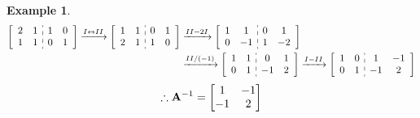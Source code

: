 \documentclass[12pt, a4paper]{article}
\newtheorem{eg}{Example}[subsection]
\def\matrixA{\vb{A}}
\begin{document}
\begin{eg}
\[\begin{aligned}\left[\begin{array}{c:c}\begin{matrix}2&1\\1&1\end{matrix}&\begin{matrix}1&0\\0&1\end{matrix}\end{array}\right]\xrightarrow[]{I\leftrightarrow II}\left[\begin{array}{c:c}\begin{matrix}1&1\\2&1\end{matrix}&\begin{matrix}0&1\\1&0\end{matrix}\end{array}\right]&\xrightarrow[]{II-2I}\left[\begin{array}{c:c}\begin{matrix}1&1\\0&-1\end{matrix}&\begin{matrix}0&1\\1&-2\end{matrix}\end{array}\right]\\&\xrightarrow[]{II/(-1)}\left[\begin{array}{c:c}\begin{matrix}1&1\\0&1\end{matrix}&\begin{matrix}0&1\\-1&2\end{matrix}\end{array}\right]\xrightarrow[]{I-II}\left[\begin{array}{c:c}\begin{matrix}1&0\\0&1\end{matrix}&\begin{matrix}1&-1\\-1&2\end{matrix}\end{array}\right]\end{aligned}\]
	\[\therefore\matrixA^{-1}=\begin{bmatrix}1&-1\\-1&2\end{bmatrix}\]
\end{eg}
\end{document}
